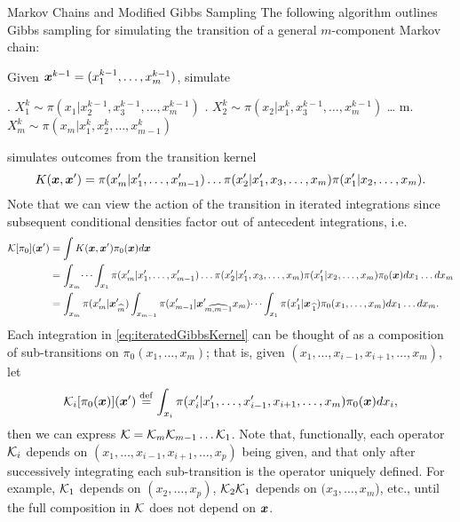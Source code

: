 \begin{chapter}{Markov Chains and Modified Gibbs Sampling}
The following algorithm outlines Gibbs sampling for simulating the transition of a general $m$-component Markov chain:
\begin{algorithm}
\caption{Gibbs sampler} \label{alg:gibbs}
  Given $\mbox{\boldmath$x$}^{k-1} = (x_1^{k-1},\dots,x_m^{k-1})$, simulate
\begin{algorithmic}[0]
  . $X_1^{k} \sim \pi(x_1|x_2^{k-1},x_3^{k-1},\dots,x_m^{k-1})$
  . $X_2^{k} \sim \pi(x_2|x_1^k,x_3^{k-1},\dots,x_m^{k-1})$ 
  \STATE \dots
  \STATE m. $X_m^{k} \sim \pi(x_m|x_1^k,x_2^{k},\dots,x_{m-1}^{k})$
\end{algorithmic}
\end{algorithm}

 simulates outcomes from the transition kernel 
\begin{equation}
  K(\mbox{\boldmath$x$},\mbox{\boldmath$x$}') = \pi(x_m'|x_1',\dots,x_{m-1}')\dots\pi(x_2'|x_1',x_3,\dots,x_m)\pi(x_1'|x_2,\dots,x_m).
\end{equation}
Note that we can view the action of the transition in iterated integrations since subsequent conditional densities factor out of antecedent integrations, i.e.
\begin{align}
  \mathcal K [\pi_0](\mbox{\boldmath$x$}') 
    &= \int K(\mbox{\boldmath$x$},\mbox{\boldmath$x$}') \pi_0(\mbox{\boldmath$x$}) d\mbox{\boldmath$x$} \nonumber \\
    &= \int_{x_m}\dots\int_{x_1}\pi(x_m'|x_1',\dots,x_{m-1}')\dots\pi(x_2'|x_1',x_3,\dots,x_m)\pi(x_1'|x_2,\dots,x_m) \pi_0(\mbox{\boldmath$x$})dx_1\dots dx_m \nonumber\\ 
    &= \int_{x_m}\pi(x_m'|\mbox{\boldmath$x$}_{\,\widehat{m}}')\int_{x_{m-1}} \pi(x_{m-1}'|\mbox{\boldmath$x$}_{\,\widehat{m,m-1}}'x_m)\dots\int_{x_1} \pi(x_1'|\mbox{\boldmath$x$}_{\,\widehat{1}}) \pi_0(x_1,\dots,x_m)dx_1\dots dx_m. \label{eq:iteratedGibbsKernel}
\end{align}
Each integration in \eqref{eq:iteratedGibbsKernel} can be thought of as a composition of sub-transitions on $\pi_0(x_1,\dots,x_m)$; that is, given $(x_1,\dots,x_{i-1},x_{i+1},\dots,x_m)$, let
\begin{equation}
  \mathcal K_i[\pi_0(\mbox{\boldmath$x$})](\mbox{\boldmath$x$}') \stackrel{\rm def}{=} \int_{x_i} \pi(x_i'|x_1',\dots,x_{i-1}',x_{i+1},\dots,x_m) \pi_0(\mbox{\boldmath$x$})dx_i,
\end{equation}
then we can express $\mathcal K = \mathcal K_m\mathcal K_{m-1} \dots \mathcal K_1$.
Note that, functionally, each operator $\mathcal K_i$ depends on $(x_1,\dots,x_{i-1},x_{i+1},\dots,x_p)$ being given, and that only after successively integrating each sub-transition is the operator uniquely defined.
For example, $\mathcal K_1$ depends on $(x_2,\dots,x_p)$, $\mathcal K_2 \mathcal K_1$ depends on $(x_3,\dots,x_m$), etc., until the full composition in $\mathcal K$ does not depend on $\mbox{\boldmath$x$}$.


\end{chapter}
